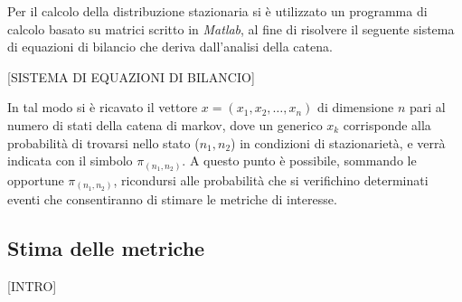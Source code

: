 Per il calcolo della distribuzione stazionaria si è utilizzato un programma di
calcolo basato su matrici scritto in \emph{Matlab}, al fine di risolvere il
seguente sistema di equazioni di bilancio che deriva dall'analisi della catena.

[SISTEMA DI EQUAZIONI DI BILANCIO]

In tal modo si è ricavato il vettore $x = (x_1, x_2, \ldots, x_n)$ di dimensione
$n$ pari al numero di stati della catena di markov, dove un generico $x_k$
corrisponde alla probabilità di trovarsi nello stato ($n_1, n_2$) in condizioni
di stazionarietà, e verrà indicata con il simbolo $\pi_{(n_1,n_2)}$. A questo
punto è possibile, sommando le opportune $\pi_{(n_1,n_2)}$, ricondursi alle
probabilità che si verifichino determinati eventi che consentiranno di stimare
le metriche di interesse.
%
%
\subsection{Stima delle metriche}
[INTRO]

